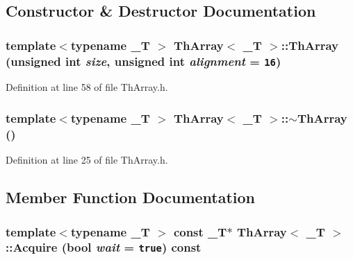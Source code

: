 \subsection{Constructor \& Destructor Documentation}
\hypertarget{class_th_array_346b54454e47f36c5ad35ac0bc15fa18}{
\subsubsection[{ThArray}]{\setlength{\rightskip}{0pt plus 5cm}template$<$typename \_\-T $>$ {\bf ThArray}$<$ \_\-T $>$::{\bf ThArray} (unsigned int {\em size}, \/  unsigned int {\em alignment} = {\tt 16})}}
\label{class_th_array_346b54454e47f36c5ad35ac0bc15fa18}




Definition at line 58 of file ThArray.h.\hypertarget{class_th_array_f1b88188b826afbad73c4fb6beecfbe9}{
\subsubsection[{$\sim$ThArray}]{\setlength{\rightskip}{0pt plus 5cm}template$<$typename \_\-T $>$ {\bf ThArray}$<$ \_\-T $>$::$\sim${\bf ThArray} ()}}
\label{class_th_array_f1b88188b826afbad73c4fb6beecfbe9}




Definition at line 25 of file ThArray.h.

\subsection{Member Function Documentation}
\hypertarget{class_th_array_b71fac6bac3509cb8cab776498291e56}{
\subsubsection[{Acquire}]{\setlength{\rightskip}{0pt plus 5cm}template$<$typename \_\-T $>$ const \_\-T$\ast$ {\bf ThArray}$<$ \_\-T $>$::Acquire (bool {\em wait} = {\tt true}) const}}
\label{class_th_array_b71fac6bac3509cb8cab776498291e56}





